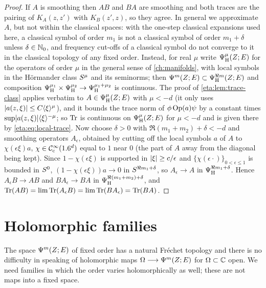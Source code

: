 \begin{proof} If $A$ is smoothing then $AB$ and $BA$ are smoothing and both traces are
the pairing of $K_A(z,z')$ with $K_B(z',z)$, so they agree. In general we approximate
$A$, but not within the classical spaces: with the one-step classical expansions used
here, a classical symbol of order $m_1$ is not a classical symbol of order $m_1+\delta$
unless $\delta\in\mathbb{N}_0$, and frequency cut-offs of a classical symbol do not converge to
it in the classical topology of any fixed order. Instead, for real $\mu$ write
$\Psi^{\mu}_{\mathrm H}(Z;E)$ for the operators of order $\mu$ in the general sense of
\cref{ch:manifolds}, with local symbols in the H\"ormander class $S^{\mu}$ and its
seminorms; then $\Psi^{m}(Z;E)\subset\Psi^{\Re m}_{\mathrm H}(Z;E)$ and composition
$\Psi^{\mu_1}_{\mathrm H}\times\Psi^{\mu_2}_{\mathrm H}\to\Psi^{\mu_1+\mu_2}_{\mathrm H}$ is
continuous. The proof of \cref{eta:lem:trace-class} applies verbatim to
$A\in\Psi^{\mu}_{\mathrm H}(Z;E)$ with $\mu<-d$ (it only uses
$\lvert a(z,\xi)\rvert\le C\langle \xi\rangle^{\mu}$), and it bounds the trace norm of $\phi\operatorname{Op}(a)\psi$ by
a constant times $\sup\lvert a(z,\xi)\rvert\langle \xi\rangle^{-\mu}$; so $\operatorname{Tr}$ is continuous on
$\Psi^{\mu}_{\mathrm H}(Z;E)$ for $\mu<-d$ and is given there by
\eqref{eta:eq:local-trace}. Now choose $\delta>0$ with $\Re(m_1+m_2)+\delta<-d$ and
smoothing operators $A_\epsilon$, obtained by cutting off the local symbols $a$ of $A$
to $\chi(\epsilon\xi)a$, $\chi\in\mathcal{C}^\infty_{\mathrm{c}}(1.6^d)$ equal to $1$ near $0$ (the part of $A$
away from the diagonal being kept). Since $1-\chi(\epsilon\xi)$ is supported in
$\lvert \xi\rvert\ge c/\epsilon$ and $\{\chi(\epsilon\cdot)\}_{0<\epsilon\le1}$ is bounded in
$S^{0}$, $(1-\chi(\epsilon\xi))a\to0$ in $S^{\Re m_1+\delta}$, so $A_\epsilon\to A$ in
$\Psi^{\Re m_1+\delta}_{\mathrm H}$. Hence $A_\epsilon B\to AB$ and $BA_\epsilon\to BA$ in
$\Psi^{\Re(m_1+m_2)+\delta}_{\mathrm H}$, and
$\operatorname{Tr}(AB)=\lim\operatorname{Tr}(A_\epsilon B)=\lim\operatorname{Tr}(BA_\epsilon)=\operatorname{Tr}(BA)$.
\end{proof}

\section{Holomorphic families}\label{eta:sec:holomorphic}

The space $\Psi^{m}(Z;E)$ of fixed order has a natural Fr\'echet topology and there is
no difficulty in speaking of holomorphic maps $\Omega\longrightarrow\Psi^{m}(Z;E)$ for
$\Omega\subset\mathbb{C}$ open. We need families in which the order varies holomorphically
as well; these are not maps into a fixed space.

